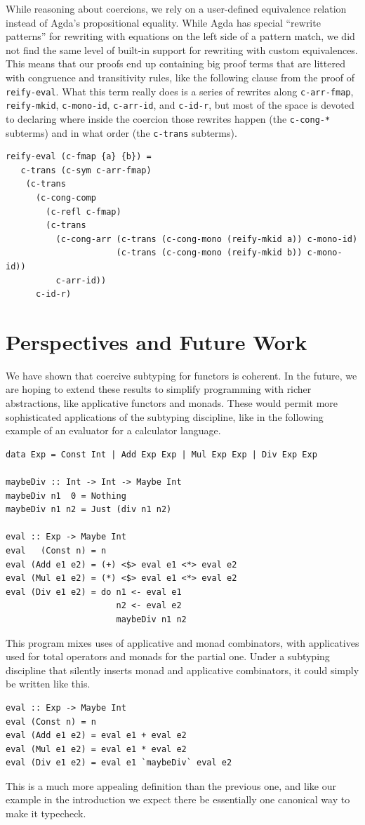 \documentclass[acmsmall,screen]{acmart}
\begin{document}
While reasoning about coercions, we rely on a user-defined equivalence relation
instead of Agda's propositional equality. While Agda has special ``rewrite
patterns'' for rewriting with equations on the left side of a pattern match, we
did not find the same level of built-in support for rewriting with custom
equivalences.  This means that our proofs end up containing big proof terms that
are littered with congruence and transitivity rules, like the following clause
from the proof of \texttt{reify-eval}. What this term really does is a series of
rewrites along \texttt{c-arr-fmap}, \texttt{reify-mkid}, \texttt{c-mono-id},
\texttt{c-arr-id}, and \texttt{c-id-r}, but most of the space is devoted to
declaring where inside the coercion those rewrites happen (the \texttt{c-cong-*}
subterms) and in what order (the \texttt{c-trans} subterms).
\begin{Verbatim}
reify-eval (c-fmap {a} {b}) =
   c-trans (c-sym c-arr-fmap)
    (c-trans
      (c-cong-comp
        (c-refl c-fmap)
        (c-trans
          (c-cong-arr (c-trans (c-cong-mono (reify-mkid a)) c-mono-id)
                      (c-trans (c-cong-mono (reify-mkid b)) c-mono-id))
          c-arr-id))
      c-id-r)
\end{Verbatim}



\section{Perspectives and Future Work}
We have shown that coercive subtyping for functors is coherent. In the future,
we are hoping to extend these results to simplify programming with richer
abstractions, like applicative functors and monads.  These would permit more
sophisticated applications of the subtyping discipline, like in the following
example of an evaluator for a calculator language.
\begin{Verbatim}
data Exp = Const Int | Add Exp Exp | Mul Exp Exp | Div Exp Exp

maybeDiv :: Int -> Int -> Maybe Int
maybeDiv n1  0 = Nothing
maybeDiv n1 n2 = Just (div n1 n2)

eval :: Exp -> Maybe Int
eval   (Const n) = n
eval (Add e1 e2) = (+) <$> eval e1 <*> eval e2
eval (Mul e1 e2) = (*) <$> eval e1 <*> eval e2
eval (Div e1 e2) = do n1 <- eval e1
                      n2 <- eval e2
                      maybeDiv n1 n2
\end{Verbatim}
This program mixes uses of applicative and monad combinators, with applicatives
used for total operators and monads for the partial one. Under a subtyping
discipline that silently inserts monad and applicative combinators, it could
simply be written like this.
\begin{Verbatim}
eval :: Exp -> Maybe Int
eval (Const n) = n
eval (Add e1 e2) = eval e1 + eval e2
eval (Mul e1 e2) = eval e1 * eval e2
eval (Div e1 e2) = eval e1 `maybeDiv` eval e2
\end{Verbatim}
This is a much more appealing definition than the previous one, and like our
example in the introduction we expect there be essentially one canonical way to
make it typecheck.
\end{document}
